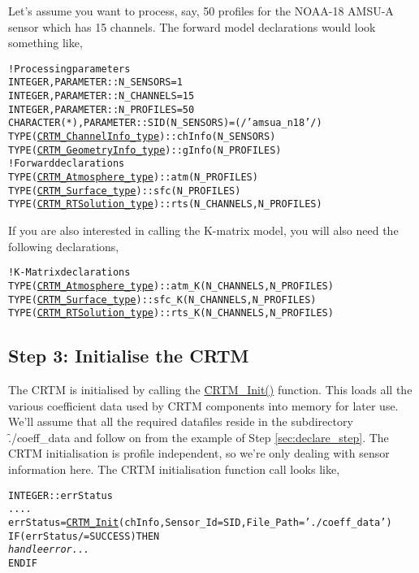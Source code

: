 Let's assume you want to process, say, 50 profiles for the NOAA-18 AMSU-A sensor which has 15 channels. The forward model declarations would look something like,
\begin{alltt}
  ! Processing parameters
  INTEGER     , PARAMETER :: N_SENSORS  =  1
  INTEGER     , PARAMETER :: N_CHANNELS = 15
  INTEGER     , PARAMETER :: N_PROFILES = 50
  CHARACTER(*), PARAMETER :: SID(N_SENSORS) = (/'amsua_n18'/)
  TYPE(\hyperref[fig:CRTM_ChannelInfo_type_structure]{CRTM_ChannelInfo_type})  :: chInfo(N_SENSORS)  
  TYPE(\hyperref[fig:CRTM_GeometryInfo_type_structure]{CRTM_GeometryInfo_type}) :: gInfo(N_PROFILES)  
  ! Forward declarations
  TYPE(\hyperref[fig:CRTM_Atmosphere_type_structure]{CRTM_Atmosphere_type})   :: atm(N_PROFILES)
  TYPE(\hyperref[fig:CRTM_Surface_type_structure]{CRTM_Surface_type})      :: sfc(N_PROFILES)
  TYPE(\hyperref[fig:CRTM_RTSolution_type_structure]{CRTM_RTSolution_type})   :: rts(N_CHANNELS,N_PROFILES)\end{alltt}
If you are also interested in calling the K-matrix model, you will also need the following declarations,
\begin{alltt}
  ! K-Matrix declarations
  TYPE(\hyperref[fig:CRTM_Atmosphere_type_structure]{CRTM_Atmosphere_type})   :: atm_K(N_CHANNELS,N_PROFILES)
  TYPE(\hyperref[fig:CRTM_Surface_type_structure]{CRTM_Surface_type})      :: sfc_K(N_CHANNELS,N_PROFILES)
  TYPE(\hyperref[fig:CRTM_RTSolution_type_structure]{CRTM_RTSolution_type})   :: rts_K(N_CHANNELS,N_PROFILES)\end{alltt}


\subsection{Step 3: Initialise the CRTM}
\label{sec:init_step}
The CRTM is initialised by calling the \hyperref[sec:CRTM_Init_interface]{\f{CRTM\_Init()}} function. This loads all the various coefficient data used by CRTM components into memory for later use. We'll assume that all the required datafiles reside in the subdirectory \f{./coeff\_data} and follow on from the example of Step \ref{sec:declare_step}. The CRTM initialisation is profile independent, so we're only dealing with sensor information here. The CRTM initialisation function call looks like,
\begin{alltt}
  INTEGER :: errStatus
  ....
  errStatus = \hyperref[sec:CRTM_Init_interface]{CRTM_Init}( chInfo, Sensor_Id=SID, File_Path='./coeff_data' )
  IF ( errStatus /= SUCCESS ) THEN 
    \textrm{\textit{handle error...}}
  END IF\end{alltt}

